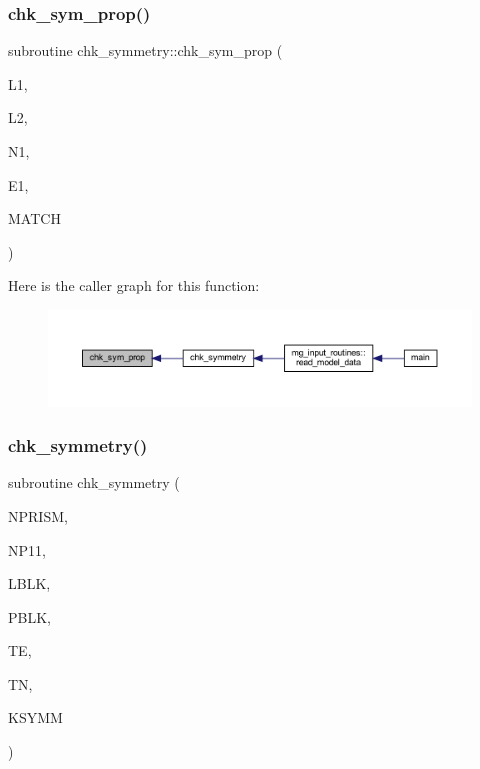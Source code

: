 \subsubsection{\texorpdfstring{chk\+\_\+sym\+\_\+prop()}{chk\_sym\_prop()}}
{\footnotesize\ttfamily subroutine chk\+\_\+symmetry\+::chk\+\_\+sym\+\_\+prop (\begin{DoxyParamCaption}\item[{integer}]{L1,  }\item[{integer}]{L2,  }\item[{real}]{N1,  }\item[{real}]{E1,  }\item[{integer}]{M\+A\+T\+CH }\end{DoxyParamCaption})}

Here is the caller graph for this function\+:
\nopagebreak
\begin{figure}[H]
\begin{center}
\leavevmode
\includegraphics[width=350pt]{Marco_8f90_a0df391e311aae0e0ab61a43fe99aa856_icgraph}
\end{center}
\end{figure}
\mbox{\label{Marco_8f90_a51e4a3fa9046596038f31e4e9a6ac7e5}} 
\subsubsection{\texorpdfstring{chk\+\_\+symmetry()}{chk\_symmetry()}}
{\footnotesize\ttfamily subroutine chk\+\_\+symmetry (\begin{DoxyParamCaption}\item[{integer, intent(inout)}]{N\+P\+R\+I\+SM,  }\item[{integer, intent(in)}]{N\+P11,  }\item[{integer, dimension(np11,2), intent(inout)}]{L\+B\+LK,  }\item[{real, dimension(np11,9), intent(inout)}]{P\+B\+LK,  }\item[{real, intent(out)}]{TE,  }\item[{real, intent(out)}]{TN,  }\item[{integer, intent(out)}]{K\+S\+Y\+MM }\end{DoxyParamCaption})}

